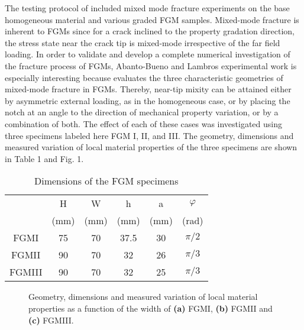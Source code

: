 The testing protocol of \cite{Abanto-Bueno2006} included mixed mode fracture experiments on the base homogeneous material and various graded FGM samples. Mixed-mode fracture is inherent to FGMs since for a crack inclined to the property gradation direction, the stress state near the crack tip is mixed-mode irrespective of the far field loading. In order to validate and develop a complete numerical investigation of the fracture process of FGMs, Abanto-Bueno and Lambros experimental work is especially interesting because evaluates the three characteristic geometries of mixed-mode fracture in FGMs. Thereby, near-tip mixity can be attained either by asymmetric external loading, as in the homogeneous case, or by placing the notch at an angle to the direction of mechanical property variation, or by a combination of both. The effect of each of these cases was investigated using three specimens labeled here FGM I, II, and III. The geometry, dimensions and measured variation of local material properties of the three specimens are shown in Table 1 and Fig. 1.

\begin{table}[h]
\caption{Dimensions of the FGM specimens}
\centering
\begin{tabular}{c c c c c c} 
\hline
& H & W & h & a & $\varphi$\\
& (mm) & (mm) & (mm) & (mm) & (rad)\\
 \hline
 FGMI & 75 & 70 & 37.5 & 30 & $\pi /2$\\
 FGMII & 90 & 70 & 32 & 26 & $\pi /3$\\ 
 FGMIII & 90 & 70 & 32 & 25 & $\pi /3$\\
 \hline
\end{tabular}
\label{tab:Table1}
\end{table}

\begin{figure*}[!ht]
    \hfill
    
    \centering
    \caption{Geometry, dimensions
and measured variation of local material properties as a function of the width of \textbf{(a)} FGMI, \textbf{(b)} FGMII and \textbf{(c)} FGMIII.}
    \label{fig:Fig1}
\end{figure*}

